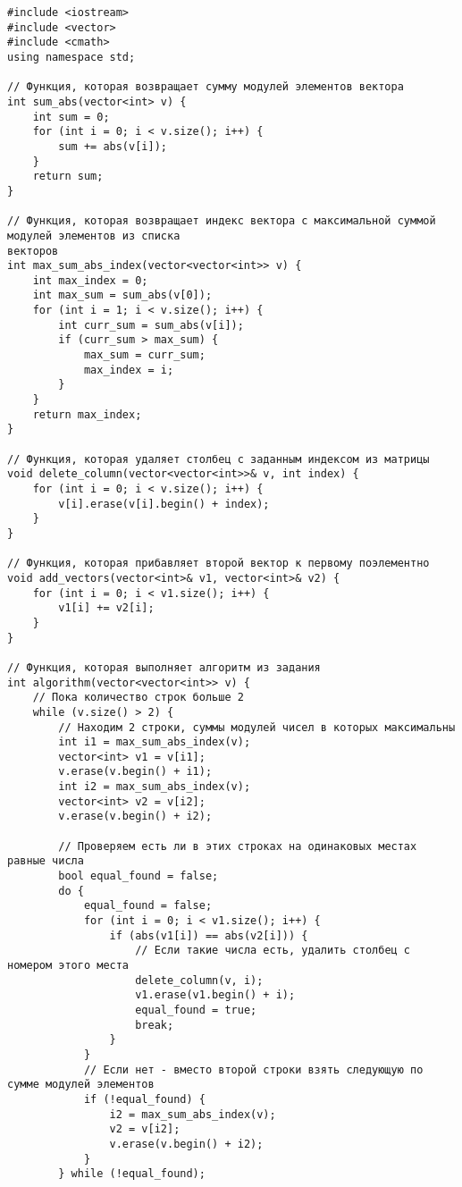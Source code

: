 \documentclass[a4paper,14p]{article}
\begin{document}
\begin{verbatim}
#include <iostream>
#include <vector>
#include <cmath>
using namespace std;

// Функция, которая возвращает сумму модулей элементов вектора
int sum_abs(vector<int> v) {
    int sum = 0;
    for (int i = 0; i < v.size(); i++) {
        sum += abs(v[i]);
    }
    return sum;
}

// Функция, которая возвращает индекс вектора с максимальной суммой модулей элементов из списка 
векторов
int max_sum_abs_index(vector<vector<int>> v) {
    int max_index = 0;
    int max_sum = sum_abs(v[0]);
    for (int i = 1; i < v.size(); i++) {
        int curr_sum = sum_abs(v[i]);
        if (curr_sum > max_sum) {
            max_sum = curr_sum;
            max_index = i;
        }
    }
    return max_index;
}

// Функция, которая удаляет столбец с заданным индексом из матрицы
void delete_column(vector<vector<int>>& v, int index) {
    for (int i = 0; i < v.size(); i++) {
        v[i].erase(v[i].begin() + index);
    }
}

// Функция, которая прибавляет второй вектор к первому поэлементно
void add_vectors(vector<int>& v1, vector<int>& v2) {
    for (int i = 0; i < v1.size(); i++) {
        v1[i] += v2[i];
    }
}

// Функция, которая выполняет алгоритм из задания
int algorithm(vector<vector<int>> v) {
    // Пока количество строк больше 2
    while (v.size() > 2) {
        // Находим 2 строки, суммы модулей чисел в которых максимальны
        int i1 = max_sum_abs_index(v);
        vector<int> v1 = v[i1];
        v.erase(v.begin() + i1);
        int i2 = max_sum_abs_index(v);
        vector<int> v2 = v[i2];
        v.erase(v.begin() + i2);

        // Проверяем есть ли в этих строках на одинаковых местах равные числа
        bool equal_found = false;
        do {
            equal_found = false;
            for (int i = 0; i < v1.size(); i++) {
                if (abs(v1[i]) == abs(v2[i])) {
                    // Если такие числа есть, удалить столбец с номером этого места
                    delete_column(v, i);
                    v1.erase(v1.begin() + i);
                    equal_found = true;
                    break;
                }
            }
            // Если нет - вместо второй строки взять следующую по сумме модулей элементов
            if (!equal_found) {
                i2 = max_sum_abs_index(v);
                v2 = v[i2];
                v.erase(v.begin() + i2);
            }
        } while (!equal_found);


\end{verbatim}
\end{document}
